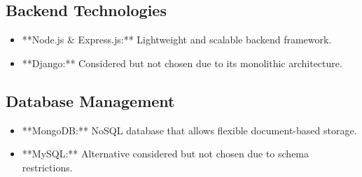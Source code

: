 \subsection{Backend Technologies}
\begin{itemize}
    \item **Node.js & Express.js:** Lightweight and scalable backend framework.
    \item **Django:** Considered but not chosen due to its monolithic architecture.
\end{itemize}

\subsection{Database Management}
\begin{itemize}
    \item **MongoDB:** NoSQL database that allows flexible document-based storage.
    \item **MySQL:** Alternative considered but not chosen due to schema restrictions.
\end{itemize}
